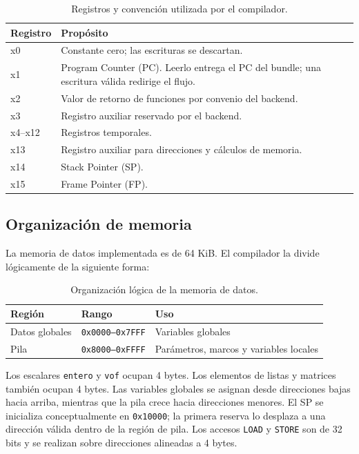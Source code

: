 \documentclass[11pt,letterpaper]{article}
\begin{document}
\begin{table}[H]
\centering
\caption{Registros y convención utilizada por el compilador.}
\begin{tabularx}{\textwidth}{>{\ttfamily}p{1.8cm}X}
\toprule
\textnormal{Registro} & \textnormal{Propósito} \\
\midrule
x0 & Constante cero; las escrituras se descartan. \\
x1 & Program Counter (PC). Leerlo entrega el PC del bundle; una escritura válida redirige el flujo. \\
x2 & Valor de retorno de funciones por convenio del backend. \\
x3 & Registro auxiliar reservado por el backend. \\
x4--x12 & Registros temporales. \\
x13 & Registro auxiliar para direcciones y cálculos de memoria. \\
x14 & Stack Pointer (SP). \\
x15 & Frame Pointer (FP). \\
\bottomrule
\end{tabularx}
\end{table}

\subsection{Organización de memoria}

La memoria de datos implementada es de 64 KiB. El compilador la divide lógicamente de la siguiente forma:

\begin{table}[H]
\centering
\caption{Organización lógica de la memoria de datos.}
\begin{tabular}{lll}
\toprule
\textbf{Región} & \textbf{Rango} & \textbf{Uso} \\
\midrule
Datos globales & \texttt{0x0000--0x7FFF} & Variables globales \\
Pila & \texttt{0x8000--0xFFFF} & Parámetros, marcos y variables locales \\
\bottomrule
\end{tabular}
\end{table}

Los escalares \texttt{entero} y \texttt{vof} ocupan 4 bytes. Los elementos de listas y matrices también ocupan 4 bytes. Las variables globales se asignan desde direcciones bajas hacia arriba, mientras que la pila crece hacia direcciones menores. El SP se inicializa conceptualmente en \texttt{0x10000}; la primera reserva lo desplaza a una dirección válida dentro de la región de pila. Los accesos \texttt{LOAD} y \texttt{STORE} son de 32 bits y se realizan sobre direcciones alineadas a 4 bytes.
\end{document}
